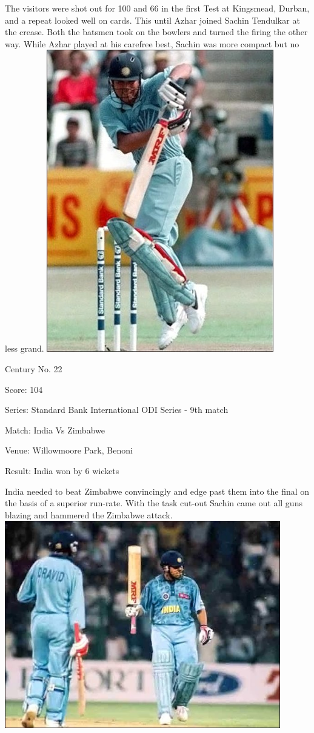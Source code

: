 \documentclass[11pt, a4paper]{article}
\begin{document}
The visitors were shot out for 100 and 66 in the first Test at Kingsmead, Durban, and a repeat looked well on cards. This until Azhar joined Sachin Tendulkar at the crease. Both the batsmen took on the bowlers and turned the firing the other way. While Azhar played at his carefree best, Sachin was more compact but no less grand.
\newpage
\includegraphics[height=0.8\textheight]{pics/22.jpg}

Century No. 22

Score: 104

Series: Standard Bank International ODI Series - 9th match

Match: India Vs Zimbabwe

Venue: Willowmoore Park, Benoni

Result: India won by 6 wickets

India needed to beat Zimbabwe convincingly and edge past them into the final on the basis of a superior run-rate. With the task cut-out Sachin came out all guns blazing and hammered the Zimbabwe attack.
\newpage
\includegraphics[width=0.9\textwidth]{pics/23.jpg}
\end{document}
